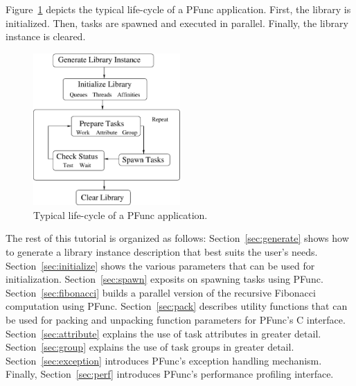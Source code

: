 Figure~\ref{fig:life_cycle} depicts the typical life-cycle of a PFunc
application.  First, the library is initialized. Then, tasks are spawned and
executed in parallel.  Finally, the library instance is cleared.

\begin{figure}[t]
\centering
\includegraphics[width=0.5\textwidth]{figs/life-cycle}
\caption{Typical life-cycle of a PFunc application.}
\label{fig:life_cycle}
\end{figure}

The rest of this tutorial is organized as follows: Section~\ref{sec:generate}
shows how to generate a library instance description that best suits the user's
needs. Section~\ref{sec:initialize} shows the various parameters that can be
used for initialization. Section~\ref{sec:spawn} exposits on spawning tasks
using PFunc. Section~\ref{sec:fibonacci} builds a parallel version of the
recursive Fibonacci computation using PFunc. Section~\ref{sec:pack} describes 
utility functions that can be used for packing and unpacking function
parameters for PFunc's C interface.  Section~\ref{sec:attribute} explains the
use of task attributes in greater detail. Section~\ref{sec:group} explains the
use of task groups in greater detail.  Section~\ref{sec:exception} introduces
PFunc's exception handling mechanism.  Finally, Section~\ref{sec:perf}
introduces PFunc's performance profiling interface.

